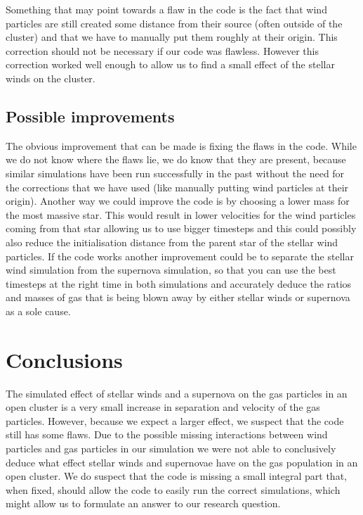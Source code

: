 \documentclass[12pt, twocolumn]{article}
\begin{document}
Something that may point towards a flaw in the code is the fact that wind particles are still created some distance from their source (often outside of the cluster) and that we have to manually put them roughly at their origin. This correction should not be necessary if our code was flawless. However this correction worked well enough to allow us to find a small effect of the stellar winds on the cluster.

\subsection{Possible improvements}
The obvious improvement that can be made is fixing the flaws in the code. While we do not know where the flaws lie, we do know that they are present, because similar simulations have been run successfully in the past without the need for the corrections that we have used (like manually putting wind particles at their origin). Another way we could improve the code is by choosing a lower mass for the most massive star. This would result in lower velocities for the wind particles coming from that star allowing us to use bigger timesteps and this could possibly also reduce the initialisation distance from the parent star of the stellar wind particles. 
If the code works another improvement could be to separate the stellar wind simulation from the supernova simulation, so that you can use the best timesteps at the right time in both simulations and accurately deduce the ratios and masses of gas that is being blown away by either stellar winds or supernova as a sole cause.


\section{Conclusions}
The simulated effect of stellar winds and a supernova on the gas particles in an open cluster is a very small increase in separation and velocity of the gas particles.
However, because we expect a larger effect, we suspect that the code still has some flaws.
Due to the possible missing interactions between wind particles and gas particles in our simulation we were not able to conclusively deduce what effect stellar winds and supernovae have on the gas population in an open cluster.
We do suspect that the code is missing a small integral part that, when fixed, should allow the code to easily run the correct simulations, which might allow us to formulate an answer to our research question. 

\printbibliography
\end{document}
